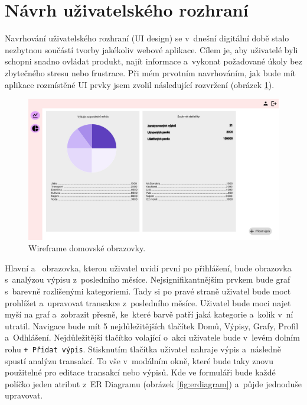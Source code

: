 \section{Návrh uživatelského rozhraní}
Navrhování uživatelského rozhraní (UI design) se v~dnešní digitální době stalo nezbytnou součástí tvorby jakékoliv webové aplikace. Cílem je, aby uživatelé byli schopni snadno ovládat produkt, najít informace a~vykonat požadované úkoly bez zbytečného stresu nebo frustrace. Při mém prvotním navrhováním, jak bude mít aplikace rozmístěné UI prvky jsem zvolil následující rozvržení (obrázek \ref{fig;wireframe}).
\begin{figure}[h]
\centering
\includegraphics[width=\textwidth]{obrazky-figures/navhrui1.pdf}
\caption{Wireframe domovské obrazovky.}
\label{fig;wireframe}
\end{figure}

Hlavní a~ obrazovka, kterou uživatel uvidí první po přihlášení, bude obrazovka s~analýzou výpisu z~posledního měsíce. Nejsignifikantnějším prvkem bude graf s~barevně rozlišenými kategoriemi. Tady si po pravé straně uživatel bude moct prohlížet a~upravovat transakce z~posledního měsíce. Uživatel bude moci najet myší na graf a~zobrazit přesně, ke~které barvě patří jaká kategorie a~kolik v~ní utratil.
Navigace bude mít 5 nejdůležitějších tlačítek Domů, Výpisy, Grafy, Profil a~Odhlášení. Nejdůležitější tlačítko volající o~akci uživatele bude v~levém dolním rohu \texttt{+ Přidat výpis}. Stisknutím tlačítka uživatel nahraje výpis a~následně spustí analýzu transakcí. To vše v~modálním okně, které bude taky znovu použitelné pro editace transakcí nebo výpisů. Kde ve formuláři bude každé políčko jeden atribut z~ER Diagramu (obrázek \ref{fig:erdiagram}) a~půjde jednoduše upravovat.

